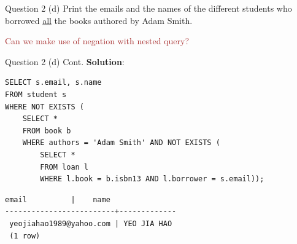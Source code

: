 \begin{frame}[fragile]{Question 2 (d)}
Print the emails and the names of the different students who borrowed \underline{all} the books authored by Adam Smith.

\textcolor{brown}{Can we make use of negation with nested query?}
\end{frame}

\begin{frame}[fragile]{Question 2 (d) Cont.}
\textbf{Solution}:
\begin{lstlisting}
SELECT s.email, s.name
FROM student s
WHERE NOT EXISTS (
	SELECT * 
	FROM book b
	WHERE authors = 'Adam Smith' AND NOT EXISTS (
		SELECT * 
		FROM loan l
		WHERE l.book = b.isbn13 AND l.borrower = s.email));
\end{lstlisting}\vspace{5pt}
\begin{lstlisting}[style=terminial]	
          email          |    name
-------------------------+-------------
 yeojiahao1989@yahoo.com | YEO JIA HAO
 (1 row)	
\end{lstlisting}
\end{frame}

